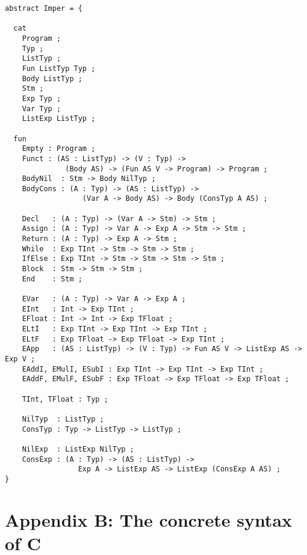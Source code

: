 \documentclass[12pt]{article}
\begin{document}
\small
\begin{verbatim}
abstract Imper = {

  cat
    Program ;
    Typ ;
    ListTyp ;
    Fun ListTyp Typ ;
    Body ListTyp ;
    Stm ;
    Exp Typ ;
    Var Typ ;
    ListExp ListTyp ;

  fun
    Empty : Program ;
    Funct : (AS : ListTyp) -> (V : Typ) -> 
              (Body AS) -> (Fun AS V -> Program) -> Program ;
    BodyNil  : Stm -> Body NilTyp ;
    BodyCons : (A : Typ) -> (AS : ListTyp) -> 
                  (Var A -> Body AS) -> Body (ConsTyp A AS) ;

    Decl   : (A : Typ) -> (Var A -> Stm) -> Stm ;
    Assign : (A : Typ) -> Var A -> Exp A -> Stm -> Stm ;
    Return : (A : Typ) -> Exp A -> Stm ;
    While  : Exp TInt -> Stm -> Stm -> Stm ;
    IfElse : Exp TInt -> Stm -> Stm -> Stm -> Stm ;
    Block  : Stm -> Stm -> Stm ;
    End    : Stm ;

    EVar   : (A : Typ) -> Var A -> Exp A ;
    EInt   : Int -> Exp TInt ;
    EFloat : Int -> Int -> Exp TFloat ;
    ELtI   : Exp TInt -> Exp TInt -> Exp TInt ;
    ELtF   : Exp TFloat -> Exp TFloat -> Exp TInt ;
    EApp   : (AS : ListTyp) -> (V : Typ) -> Fun AS V -> ListExp AS -> Exp V ;
    EAddI, EMulI, ESubI : Exp TInt -> Exp TInt -> Exp TInt ;
    EAddF, EMulF, ESubF : Exp TFloat -> Exp TFloat -> Exp TFloat ;

    TInt, TFloat : Typ ;

    NilTyp  : ListTyp ;
    ConsTyp : Typ -> ListTyp -> ListTyp ;

    NilExp  : ListExp NilTyp ;
    ConsExp : (A : Typ) -> (AS : ListTyp) -> 
                 Exp A -> ListExp AS -> ListExp (ConsExp A AS) ;
}
\end{verbatim}
\normalsize
\newpage


\section*{Appendix B: The concrete syntax of C}
\end{document}
